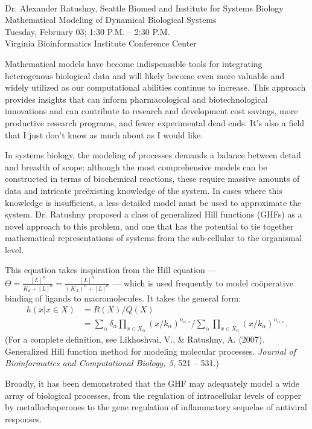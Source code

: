 \documentclass[11pt,letterpaper,final] {article}
\begin{document}

\\
Dr. Alexander Ratushny, Seattle Biomed and Institute for Systems Biology\\
Mathematical Modeling of Dynamical Biological Systems\\
Tuesday, February 03; 1:30 P.M. -- 2:30 P.M.\\
Virginia Bioinformatics Institute Conference Center\\[0.4cm]


Mathematical models have become indispensable tools for integrating heterogenous biological data and will likely become even more valuable and widely utilized as our computational abilities continue to increase. This approach provides insights that can inform pharmacological and biotechnological innovations and can contribute to research and development cost savings, more productive research programs, and fewer experimental dead ends. It's also a field that I just don't know as much about as I would like.\\[0.4cm]


In systems biology, the modeling of processes demands a balance between detail and breadth of scope: although the most comprehensive models can be constructed in terms of biochemical reactions, these require massive amounts of data and intricate pre\"{e}xisting knowledge of the system. In cases where this knowledge is insufficient, a less detailed model must be used to approximate the system. Dr. Ratushny proposed a class of generalized Hill functions (GHFs) as a novel approach to this problem, and one that has the potential to tie together mathematical representations of systems from the sub-cellular to the organismal level.

This equation takes inspiration from the Hill equation --- $\Theta = \frac{[L]^n}{K_d+[L]^n}=\frac{[L]^n}{\left(K_A\right)^n+[L]^n}$ --- which is used frequently to model co\"{o}perative binding of ligands to macromolecules. It takes the general form:
\begin{align*}
h(x|x\in X) &= R(X)/Q(X)\\
& =\sum_{
		\alpha
	}{
		\delta_{
			\alpha
		}
	} \prod_{
		x\in X_{
			\alpha
		}
	}
	\left(
		x/k_{\alpha}
	\right)^{
		n_{
			\alpha,x
		}
	}/\sum_{
		\alpha
	}\prod_{
		x\in X_{
			\alpha
		}
	}\left(
		x/k_{
			\alpha
		}
	\right)^{
		n_{
			\alpha,x
		}
	}.
\end{align*}
(For a complete definition, see Likhoshvai, V., \& Ratushny, A. (2007). Generalized Hill function method for modeling molecular processes. {\itshape Journal of Bioinformatics and Computational Biology, 5}, 521 -- 531.)

Broadly, it has been demonstrated that the GHF may adequately model a wide array of biological processes, from the regulation of intracellular levels of copper by metallochaperones to the gene regulation of inflammatory sequelae of antiviral responses.
\end{document}
